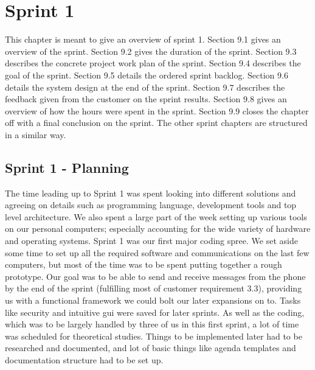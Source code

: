 \chapter{Sprint 1}

This chapter is meant to give an overview of sprint 1. Section 9.1 gives an overview of the sprint. Section 9.2 gives the duration of the sprint. Section 9.3 describes the concrete project work plan of the sprint. Section 9.4 describes the goal of the sprint. Section 9.5 details the ordered sprint backlog. Section 9.6 details the system design at the end of the sprint. Section 9.7 describes the feedback given from the customer on the sprint results. Section 9.8 gives an overview of how the hours were spent in the sprint. Section 9.9 closes the chapter off with a final conclusion on the sprint. The other sprint chapters are structured in a similar way.

\section{Sprint 1 - Planning}
The time leading up to Sprint 1 was spent looking into different solutions and agreeing on details such as programming language, development tools and top level architecture. We also spent a large part of the week setting up various tools on our personal computers; especially accounting for the wide variety of hardware and operating systems.
\newline
\newline
Sprint 1 was our first major coding spree. We set aside some time to set up all the required software and communications on the last few computers, but most of the time was to be spent putting together a rough prototype. Our goal was to be able to send and receive messages from the phone by the end of the sprint (fulfilling most of customer requirement 3.3), providing us with a functional framework we could bolt our later expansions on to. Tasks like security and intuitive \gls{gui} were saved for later sprints.
\newline
\newline
As well as the coding, which was to be largely handled by three of us in this first sprint, a lot of time was scheduled for theoretical studies. Things to be implemented later had to be researched and documented, and lot of basic things like agenda templates and documentation structure had to be set up.